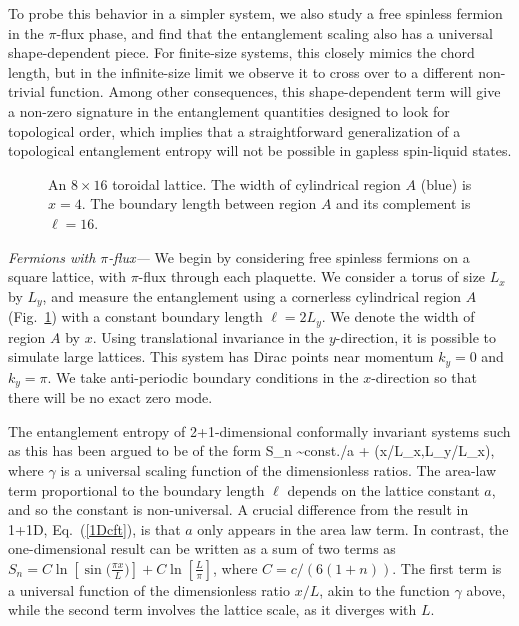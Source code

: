 \documentclass[prl,aps,twocolumn,floatfix,amsmath,amssymb,superscriptaddress,tightenlines]{revtex4}
\begin{document}
To probe this behavior in a simpler system, we also study
a free spinless fermion in the $\pi$-flux phase, and find that the entanglement scaling also has a universal shape-dependent piece.
For finite-size systems, this closely mimics the chord length, but in the infinite-size limit we observe it to cross over to a different non-trivial function.
Among other consequences, this shape-dependent term will give a non-zero signature in the entanglement quantities \cite{KP,LW} designed to look for topological order, which implies that a straightforward generalization of a topological entanglement entropy will not be possible in gapless spin-liquid states. 
 
  \begin{figure}
   \begin{center}
   \end{center}
   \caption{An $8 \times 16$ toroidal lattice.  The width of cylindrical region $A$ (blue) is $x=4$.  The boundary length between region $A$ and its complement is $\ell = 16$. }
   \label{fig:torus}
 \end{figure}
 
{\it Fermions with $\pi$-flux---}
We begin by considering
free spinless fermions on a square lattice, with $\pi$-flux through each plaquette.  We consider a torus of size $L_x$ by $L_y$, and
measure the entanglement %
using a cornerless cylindrical region $A$ (Fig.~\ref{fig:torus}) with a constant boundary length $\ell = 2L_y$.
We denote the width of region $A$ by $x$.
Using translational invariance in the $y$-direction, it is possible to simulate large lattices.  This system has Dirac points near momentum $k_y=0$ and $k_y=\pi$.  We take anti-periodic boundary conditions in the $x$-direction so that there will be no exact zero mode.

The entanglement entropy of 2+1-dimensional conformally invariant systems such as this has been argued to be of the form \cite{ryu,ZGV}
\be
S_n \sim {\rm const.}\times \ell /a + \gamma(x/L_x,L_y/L_x),
\ee
where $\gamma$ is a universal scaling function of the dimensionless ratios.
The area-law term proportional to the boundary length $\ell$ depends on the lattice constant $a$, and so the constant is non-universal. A crucial difference
from the result in 1+1D, Eq.~(\ref{1Dcft}), is that $a$ only appears in the area law term.  In contrast, the one-dimensional result can be written as a sum of two terms as
$S_n =C \ln[\sin\big( \frac{\pi x}{L} \big)]+ C\ln[\frac{L}{\pi}] $, where $C=c/(6(1+n))$.
The first term is a universal function of the dimensionless ratio $x/L$, akin to the function $\gamma$ above, while the second term involves the lattice scale, as it diverges with $L$.
\end{document}
